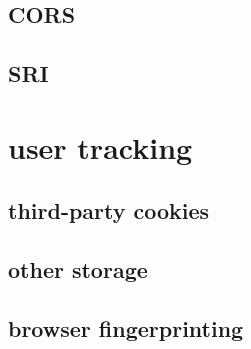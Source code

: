 \subsection{CORS}

\subsection{SRI}


\section{user tracking}


\subsection{third-party cookies}



\subsection{other storage}


\subsection{browser fingerprinting}


%


